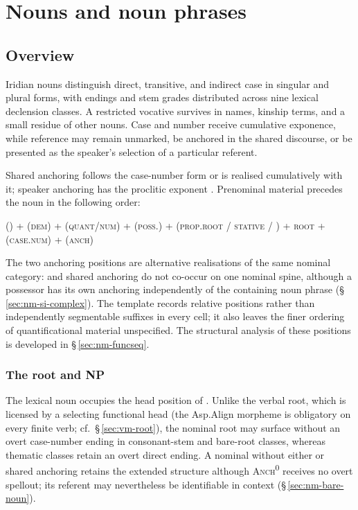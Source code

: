 \chapter{Nouns and noun phrases}
\label{ch:nouns}

\section{Overview}
\label{sec:nm-overview}

Iridian nouns distinguish direct, transitive, and indirect case in singular
and plural forms, with endings and stem grades distributed across nine
lexical declension classes. A restricted vocative survives in names, kinship
terms, and a small residue of other nouns. Case and number receive cumulative
exponence, while reference may remain unmarked, be anchored in the shared
discourse, or be presented as the speaker's selection of a particular referent.

Shared anchoring follows the case-number form or is realised cumulatively
with it; speaker anchoring has the proclitic exponent . Prenominal
material precedes the noun in the following order:

\begin{center}
() + (\textsc{dem}) + (\textsc{quant}/\textsc{num}) +
(\textsc{poss}.\Ind{}) + (\textsc{prop.root} / \textsc{stative} / ) +
\textsc{root} + (\textsc{case.num}) + (\textsc{anch})
\end{center}

The two anchoring positions are alternative realisations of the same nominal
category:  and shared anchoring do not co-occur on one nominal spine,
although a possessor has its own anchoring independently of the containing
noun phrase (§\,\ref{sec:nm-si-complex}). The template records relative
positions rather than independently segmentable suffixes in every cell;
it also leaves the finer ordering of quantificational material unspecified.
The structural analysis of these positions is developed in
§\,\ref{sec:nm-funcseq}.

\subsection{The root and NP}
\label{sec:nm-root}

The lexical noun occupies the head position of . Unlike the verbal
root, which is licensed by a selecting functional head (the Asp.Align morpheme
is obligatory on every finite verb; cf.\ §\,\ref{sec:vm-root}), the nominal root
may surface without an overt case-number ending in consonant-stem and bare-root
classes, whereas thematic classes retain an overt direct ending. A nominal
without either  or shared anchoring retains the extended structure
although \textsc{Anch\textsuperscript{0}} receives no overt spellout; its
referent may nevertheless be identifiable in context
(§\,\ref{sec:nm-bare-noun}).

